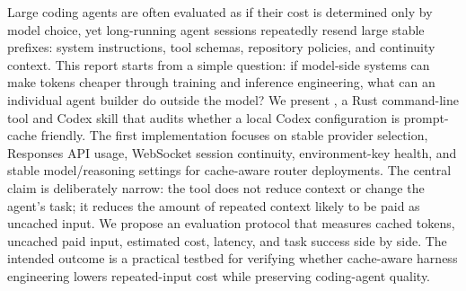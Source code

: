 Large coding agents are often evaluated as if their cost is determined only by model choice, yet long-running agent sessions repeatedly resend large stable prefixes: system instructions, tool schemas, repository policies, and continuity context. This report starts from a simple question: if model-side systems can make tokens cheaper through training and inference engineering, what can an individual agent builder do outside the model? We present \toolname, a Rust command-line tool and Codex skill that audits whether a local Codex configuration is prompt-cache friendly. The first implementation focuses on stable provider selection, Responses API usage, WebSocket session continuity, environment-key health, and stable model/reasoning settings for cache-aware router deployments. The central claim is deliberately narrow: the tool does not reduce context or change the agent's task; it reduces the amount of repeated context likely to be paid as uncached input. We propose an evaluation protocol that measures cached tokens, uncached paid input, estimated cost, latency, and task success side by side. The intended outcome is a practical testbed for verifying whether cache-aware harness engineering lowers repeated-input cost while preserving coding-agent quality.
